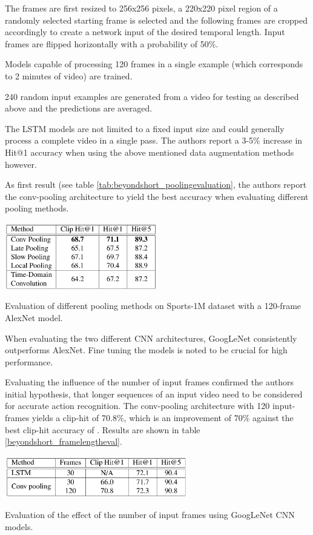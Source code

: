 The frames are first resized to 256x256 pixels, a 220x220 pixel region of a randomly selected starting frame is selected and the following frames are cropped accordingly to create a network input of the desired temporal length.
Input frames are flipped horizontally with a probability of 50\%.

Models capable of processing 120 frames in a single example (which corresponds to 2 minutes of video) are trained.

240 random input examples are generated from a video for testing as described above and the predictions are averaged.

The LSTM models are not limited to a fixed input size and could generally process a complete video in a single pass.
The authors report a 3-5\% increase in Hit@1 accuracy when using the above mentioned data augmentation methods however.

As first result (see table \ref{tab:beyondshort_poolingevaluation}, the authors report the conv-pooling architecture to yield the best accuracy when evaluating different pooling methods.

\begin{table}[H]
    \centering
    \includegraphics[width=0.5\textwidth]{img_deep/beyondshort_poolingevaluation}
    \caption{Evaluation of different pooling methods on Sports-1M dataset with a 120-frame AlexNet model. \cite{ng_beyond_2015}}
    \label{tab:beyondshort_poolingevaluation}
\end{table}

When evaluating the two different CNN architectures, GoogLeNet consistently outperforms AlexNet.
Fine tuning the models is noted to be crucial for high performance.

Evaluating the influence of the number of input frames confirmed the authors initial hypothesis, that longer sequences of an input video need to be considered for accurate action recognition.
The conv-pooling architecture with 120 input-frames yields a clip-hit of 70.8\%, which is an improvement of 70\% against the best clip-hit accuracy of \textcite{karpathy_large-scale_2014}. 
Results are shown in table \ref{beyondshort_framelengtheval}.

\begin{table}[H]
    \centering
    \includegraphics[width=0.6\textwidth]{img_deep/beyondshort_framelengtheval}
    \caption{Evaluation of the effect of the number of input frames using GoogLeNet CNN models. \textcite{karpathy_large-scale_2014}}
    \label{tab:beyondshort_framelengtheval}
\end{table}


